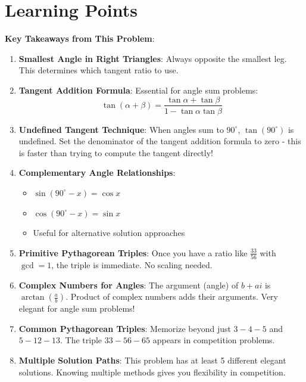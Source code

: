 \documentclass[12pt]{article}
\begin{document}
\section*{Learning Points}

\textbf{Key Takeaways from This Problem}:

\begin{enumerate}
    \item \textbf{Smallest Angle in Right Triangles}: Always opposite the smallest leg. This determines which tangent ratio to use.
    
    \item \textbf{Tangent Addition Formula}: Essential for angle sum problems:
    $$\tan(\alpha + \beta) = \frac{\tan\alpha + \tan\beta}{1 - \tan\alpha \tan\beta}$$
    
    \item \textbf{Undefined Tangent Technique}: When angles sum to $90^{\circ}$, $\tan(90^{\circ})$ is undefined. Set the denominator of the tangent addition formula to zero - this is faster than trying to compute the tangent directly!
    
    \item \textbf{Complementary Angle Relationships}: 
    \begin{itemize}
        \item $\sin(90^{\circ} - x) = \cos x$
        \item $\cos(90^{\circ} - x) = \sin x$
        \item Useful for alternative solution approaches
    \end{itemize}
    
    \item \textbf{Primitive Pythagorean Triples}: Once you have a ratio like $\frac{33}{56}$ with $\gcd = 1$, the triple is immediate. No scaling needed.
    
    \item \textbf{Complex Numbers for Angles}: The argument (angle) of $b + ai$ is $\arctan(\frac{a}{b})$. Product of complex numbers adds their arguments. Very elegant for angle sum problems!
    
    \item \textbf{Common Pythagorean Triples}: Memorize beyond just $3-4-5$ and $5-12-13$. The triple $33-56-65$ appears in competition problems.
    
    \item \textbf{Multiple Solution Paths}: This problem has at least 5 different elegant solutions. Knowing multiple methods gives you flexibility in competition.
\end{enumerate}
\end{document}
